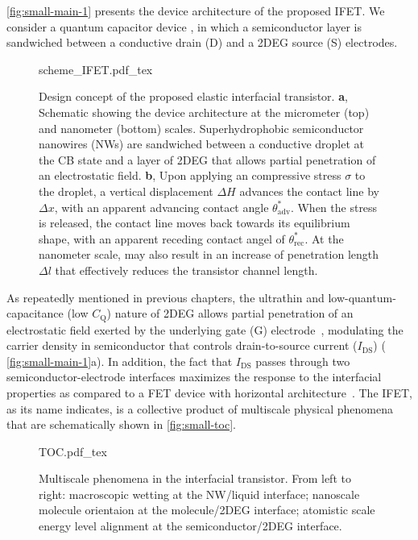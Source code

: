  \autoref{fig:small-main-1} presents the device architecture of the proposed
IFET. We consider a quantum capacitor device \autocite{Luryi_1988_Quantum}, in which
a semiconductor layer is sandwiched between a conductive drain (D) and
a 2DEG source (S) electrodes.
%
\begin{figure}[htbp]
  \centering
  {scheme_IFET.pdf_tex}
  \caption{\label{fig:small-main-1} Design concept of the proposed
    elastic interfacial transistor. \textbf{a}, Schematic showing the device
    architecture at the micrometer (top) and nanometer (bottom)
    scales. Superhydrophobic semiconductor nanowires (NWs) are
    sandwiched between a conductive droplet at the CB state and a
    layer of 2DEG that allows partial penetration of an electrostatic
    field. \textbf{b}, Upon applying an compressive stress \(\sigma\) to the
    droplet, a vertical displacement \(\Delta H\) advances the contact
    line by \(\Delta x\), with an apparent advancing contact angle
    \(\theta_{\mathrm{adv}}^{*}\). When the stress is released, the
    contact line moves back towards its equilibrium shape, with an
    apparent receding contact angel of
    \(\theta_{\mathrm{rec}}^{*}\). At the nanometer scale, may also
    result in an increase of penetration length \(\Delta l\) that
    effectively reduces the transistor channel length.}
\end{figure}
%
%
As repeatedly mentioned in previous chapters, the ultrathin and
low-quantum-capacitance (low \(C_{\mathrm{Q}}\)) nature of 2DEG allows
partial penetration of an electrostatic field exerted by the
underlying gate (G) electrode~\autocite{Shih_2015_PartiallyScreened},
modulating the carrier density in semiconductor that controls
drain-to-source current (\(I_{\mathrm{DS}}\)) (
\autoref{fig:small-main-1}a).
%
In addition, the fact that \(I_{\mathrm{DS}}\) passes through two
semiconductor-electrode interfaces maximizes the response to the
interfacial properties as compared to a FET device with horizontal
architecture~\autocite{Ben_Sasson_2014_fet_rev}. The IFET, as its name
indicates, is a collective product of multiscale physical phenomena
that are schematically shown in \autoref{fig:small-toc}.
\begin{figure}[!htbp]
  \centering
  {TOC.pdf_tex}
  \caption{\label{fig:small-toc} Multiscale phenomena in the
    interfacial transistor. From left to right: macroscopic wetting at
    the NW/liquid interface; nanoscale molecule orientaion at the
    molecule/2DEG interface; atomistic scale energy level alignment at
    the semiconductor/2DEG interface.  }
\end{figure}


